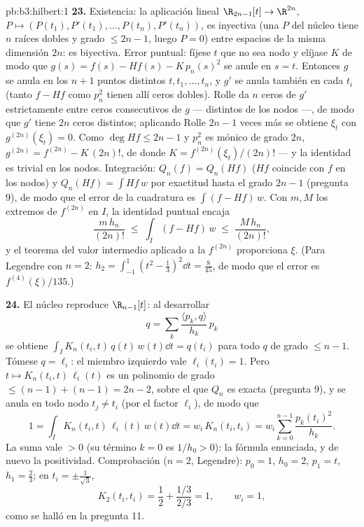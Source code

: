 \begin{solution}{pb:b3:hilbert:1}
\textbf{23.} Existencia: la aplicación lineal $\R_{2n-1}[t] \to
\R^{2n}$, $P \mapsto (P(t_1), P'(t_1), \dots, P(t_n),
P'(t_n))$, es inyectiva (una $P$ del núcleo tiene $n$ raíces dobles y
grado $\leq 2n - 1$, luego $P = 0$) entre espacios de la misma dimensión
$2n$: es biyectiva. Error puntual: fíjese $t$ que no sea nodo y elíjase
$K$ de modo que $g(s) = f(s) - Hf(s) -
K\,p_n(s)^2$ se anule en $s = t$. Entonces $g$ se anula en los $n + 1$
puntos distintos $t, t_1, \dots, t_n$, y $g'$ se anula también en cada
$t_i$ (tanto $f - Hf$ como $p_n^2$ tienen allí ceros dobles). Rolle da
$n$ ceros de $g'$ estrictamente entre ceros consecutivos de $g$ ---
distintos de los nodos ---, de modo que $g'$ tiene $2n$ ceros distintos;
aplicando Rolle $2n - 1$ veces más se obtiene $\xi_t$ con
$g^{(2n)}(\xi_t) = 0$. Como $\deg Hf \leq 2n - 1$ y $p_n^2$ es mónico de
grado $2n$, $g^{(2n)} = f^{(2n)} - K\,(2n)!$, de donde $K =
f^{(2n)}(\xi_t)/(2n)!$ --- y la identidad es trivial en los nodos.
Integración: $Q_n(f) = Q_n(Hf)$ ($Hf$ coincide con $f$ en los nodos) y
$Q_n(Hf) = \int Hf\,w$ por exactitud hasta el grado $2n - 1$ (pregunta
9), de modo que el error de la cuadratura es $\int(f - Hf)\,w$. Con
$m, M$ los extremos de $f^{(2n)}$ en $I$, la identidad puntual encaja
\[
\frac{m\,h_n}{(2n)!} \;\leq\; \int_I(f - Hf)\,w
\;\leq\; \frac{M\,h_n}{(2n)!} ,
\]
y el teorema del valor intermedio aplicado a la
 $f^{(2n)}$ proporciona
$\xi$. (Para Legendre con $n = 2$: $h_2
= \int_{-1}^1(t^2 - \frac13)^2\dd t = \frac8{45}$, de modo que el error
es $f^{(4)}(\xi)/135$.)

\textbf{24.} El núcleo reproduce $\R_{n-1}[t]$: al desarrollar
\[
q = \sum_k\frac{\langle p_k, q\rangle}{h_k}\,p_k
\]
se obtiene
$\int_I K_n(t_i, t)\,q(t)\,w(t)\dd t = q(t_i)$ para todo $q$ de grado
$\leq n - 1$. Tómese $q = \ell_i$: el miembro izquierdo vale
$\ell_i(t_i) = 1$. Pero $t \mapsto K_n(t_i,
t)\,\ell_i(t)$ es un polinomio de grado $\leq (n - 1) + (n
- 1) = 2n - 2$, sobre el que $Q_n$ es exacta (pregunta 9), y se anula en
todo nodo $t_j \neq t_i$ (por el factor $\ell_i$), de modo que
\[
1 = \int_I K_n(t_i, t)\,\ell_i(t)\,w(t)\dd t
= w_i\,K_n(t_i, t_i)
= w_i\sum_{k=0}^{n-1}\frac{p_k(t_i)^2}{h_k} .
\]
La suma vale $> 0$ (su término $k = 0$ es $1/h_0 > 0$): la fórmula
enunciada, y de nuevo la positividad. Comprobación ($n = 2$, Legendre):
$p_0 = 1$, $h_0 = 2$, $p_1 = t$, $h_1 = \frac23$; en
$t_i = \pm\frac1{\sqrt3}$,
\[
K_2(t_i, t_i) = \frac12 + \frac{1/3}{2/3} = 1,
\qquad w_i = 1,
\]
como se halló en la pregunta 11.


\end{solution}
